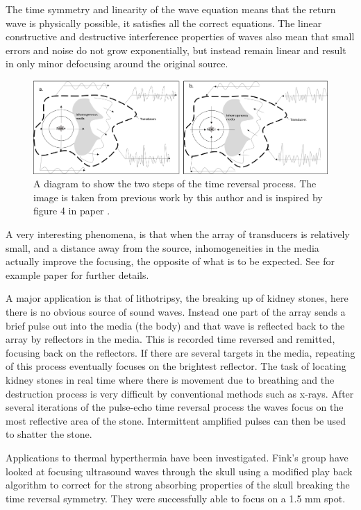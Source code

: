 \documentclass[11pt]{article} %
\begin{document}
\begin{itemize}
		The time symmetry  and linearity of the wave equation means that the return wave is physically possible, it satisfies all the correct equations. The linear constructive and destructive interference properties of waves also mean that small errors and noise do not grow exponentially, but instead remain linear and result in only minor defocusing around the original source.
		\begin{figure}
			\centering
			\includegraphics[width=\linewidth]{"Report_images/Time-reversal cavity"}
			\caption{A diagram to show the two steps of the time reversal process. The image is taken from previous work by this author \cite{Duff2018} and is inspired by figure 4 in paper \cite{Fink1992}.} 
			\label{fig:time-reversal-cavity}
		\end{figure}
		
		A very interesting phenomena, is that when the array of transducers is relatively small, and a distance away from the source, inhomogeneities in the media actually improve the focusing, the opposite of what is to be expected. See for example paper \cite{Borcea2002} for further details. 
		
		A major application is that of lithotripsy, the breaking up of kidney stones, here there is no obvious source of sound waves. Instead one part of the array sends a brief pulse out into the media (the body) and that wave is reflected back to the array by reflectors in the media. This is recorded time reversed and remitted, focusing back on the reflectors. If there are several targets in the media, repeating of this process eventually focuses on the brightest reflector. 
	The task of locating kidney stones in real time where there is movement due to breathing and the destruction process is very difficult by conventional methods such as x-rays. After several iterations of the pulse-echo time reversal process the  waves focus on the most reflective area of the stone. Intermittent amplified pulses can then be used to shatter the stone. 
		
		Applications to thermal hyperthermia have been investigated. Fink's group have looked at focusing ultrasound waves through the skull using a modified play back algorithm to correct for the strong absorbing properties of the skull breaking the time reversal symmetry. They were successfully able to focus on a 1.5 mm spot. 
		

\end{itemize}
\end{document}
